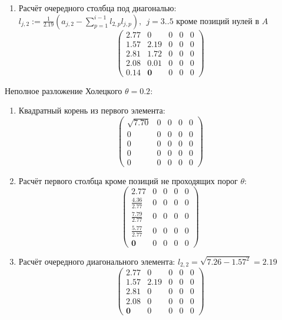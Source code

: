 \begin{multicols}{3}
\begin{enumerate}
    \item Расчёт очередного столбца под диагональю:$l_{j,2} := \frac{1}{2.19}(a_{j,2} - \sum_{p=1}^{i-1}l_{2,p}l_{j,p}),~~j=3..5$ кроме позиций нулей в $A$
    $$\begin{pmatrix}
        2.77 & 0          & 0 & 0 & 0 \\
        1.57 & 2.19       & 0 & 0 & 0 \\
        2.81 & 1.72       & 0 & 0 & 0 \\
        2.08 & 0.01       & 0 & 0 & 0 \\
        0.14 & \mathbf{0} & 0 & 0 & 0
    \end{pmatrix}$$
\end{enumerate}

\columnbreak
Неполное разложение Холецкого $\theta=0.2$:
\begin{enumerate}
    \item Квадратный корень из первого элемента:
    $$\begin{pmatrix}
        \sqrt{7.70} & 0 & 0 & 0 & 0 \\
        0           & 0 & 0 & 0 & 0 \\
        0           & 0 & 0 & 0 & 0 \\
        0           & 0 & 0 & 0 & 0 \\
        0           & 0 & 0 & 0 & 0
    \end{pmatrix}$$

    \item Расчёт первого столбца кроме позиций не проходящих порог $\theta$:
    $$\begin{pmatrix}
        2.77              & 0 & 0 & 0 & 0 \\
        \frac{4.36}{2.77} & 0 & 0 & 0 & 0 \\
        \frac{7.79}{2.77} & 0 & 0 & 0 & 0 \\
        \frac{5.77}{2.77} & 0 & 0 & 0 & 0 \\
        \mathbf{0}        & 0 & 0 & 0 & 0
    \end{pmatrix}$$

    \item Расчёт очередного диагонального элемента: $l_{2,2} = \sqrt{7.26 - 1.57^2} = 2.19$
    $$\begin{pmatrix}
        2.77       & 0    & 0 & 0 & 0 \\
        1.57       & 2.19 & 0 & 0 & 0 \\
        2.81       & 0    & 0 & 0 & 0 \\
        2.08       & 0    & 0 & 0 & 0 \\
        \mathbf{0} & 0    & 0 & 0 & 0
    \end{pmatrix}$$


\end{enumerate}
\end{multicols}
